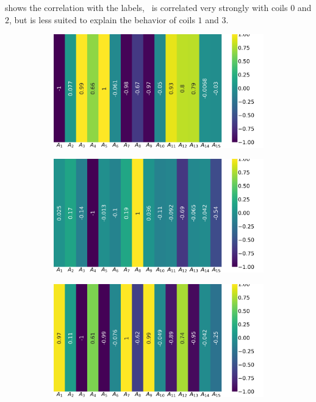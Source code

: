 \subsubsection{\an}
 shows the correlation with the labels, \an\ is correlated very strongly with
coils $0$ and $2$, but is less suited to explain the behavior of coils $1$ and $3$.
\begin{figure}[!ht]
	\centering
	\begin{subfigure}{0.49\linewidth}
		\includegraphics[width=\linewidth]{img/qlp_corr/An_coil0.png}
	\end{subfigure}
	\begin{subfigure}{0.49\linewidth}
		\includegraphics[width=\linewidth]{img/qlp_corr/An_coil1.png}
	\end{subfigure}
	\begin{subfigure}{0.49\linewidth}
		\includegraphics[width=\linewidth]{img/qlp_corr/An_coil2.png}

\end{subfigure}
\end{figure}
